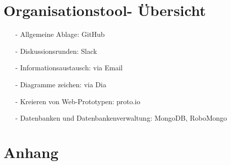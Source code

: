 \documentclass[12pt,a4paper]{article}
\begin{document}
\newpage
\section*{Organisationstool- Übersicht}
\begin{itemize}
\item[-]Allgemeine Ablage: GitHub
\item[-]Diskussionsrunden: Slack
\item[-]Informationsaustausch: via Email
\item[-]Diagramme zeichen: via Dia 
\item[-]Kreieren von Web-Prototypen: proto.io
\item[-]Datenbanken und Datenbankenverwaltung: MongoDB, RoboMongo
\end{itemize}
\newpage
\section*{Anhang}
\end{document}
